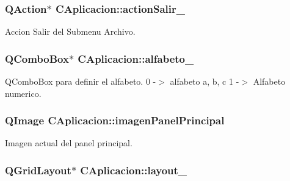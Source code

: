 \subsubsection[{\texorpdfstring{action\+Salir\+\_\+}{actionSalir_}}]{\setlength{\rightskip}{0pt plus 5cm}Q\+Action$\ast$ C\+Aplicacion\+::action\+Salir\+\_\+\hspace{0.3cm}{\ttfamily [private]}}\hypertarget{classCAplicacion_ac878000751c05f9491a9de6671e6cde0}{}\label{classCAplicacion_ac878000751c05f9491a9de6671e6cde0}


Accion Salir del Submenu Archivo. 

\subsubsection[{\texorpdfstring{alfabeto\+\_\+}{alfabeto_}}]{\setlength{\rightskip}{0pt plus 5cm}Q\+Combo\+Box$\ast$ C\+Aplicacion\+::alfabeto\+\_\+\hspace{0.3cm}{\ttfamily [private]}}\hypertarget{classCAplicacion_a2bc2fca932b919c027f2c4a35f837de0}{}\label{classCAplicacion_a2bc2fca932b919c027f2c4a35f837de0}


Q\+Combo\+Box para definir el alfabeto. 0 -\/$>$ alfabeto a, b, c 1 -\/$>$ Alfabeto numerico. 

\subsubsection[{\texorpdfstring{imagen\+Panel\+Principal}{imagenPanelPrincipal}}]{\setlength{\rightskip}{0pt plus 5cm}Q\+Image C\+Aplicacion\+::imagen\+Panel\+Principal\hspace{0.3cm}{\ttfamily [private]}}\hypertarget{classCAplicacion_a0d02a7838c0974bffc76e8dd08848dc9}{}\label{classCAplicacion_a0d02a7838c0974bffc76e8dd08848dc9}


Imagen actual del panel principal. 

\subsubsection[{\texorpdfstring{layout\+\_\+}{layout_}}]{\setlength{\rightskip}{0pt plus 5cm}Q\+Grid\+Layout$\ast$ C\+Aplicacion\+::layout\+\_\+\hspace{0.3cm}{\ttfamily [private]}}\hypertarget{classCAplicacion_a135b700bb291de086b00bcc4481ffc8b}{}\label{classCAplicacion_a135b700bb291de086b00bcc4481ffc8b}


